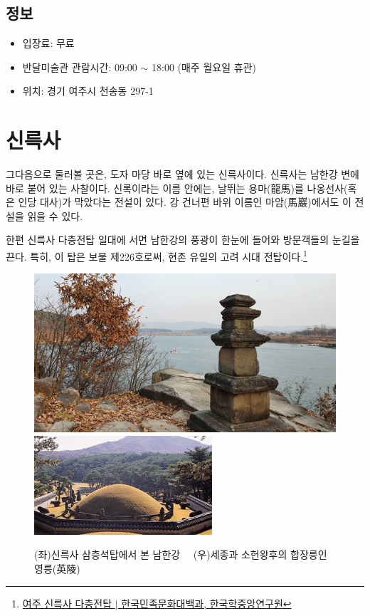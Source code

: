 \subsection{정보}

\begin{itemize}
\item 입장료: 무료
\item 반달미술관 관람시간: 09:00 $\sim$ 18:00 (매주 월요일 휴관)
\item 위치: 경기 여주시 천송동 297-1
\end{itemize}

\section{신륵사}
그다음으로 둘러볼 곳은, 도자 마당 바로 옆에 있는 신륵사이다. 신륵사는 남한강 변에 바로 붙어 있는 사찰이다. 
신록이라는 이름 안에는, 날뛰는 용마(龍馬)를 나옹선사(혹은 인당 대사)가 막았다는 전설이 있다.
강 건너편 바위 이름인 마암(馬巖)에서도 이 전설을 읽을 수 있다.


한편 신륵사 다층전탑 일대에 서면 남한강의 풍광이 한눈에 들어와 방문객들의 눈길을 끈다. 
특히, 이 탑은 보물 제226호로써, 현존 유일의 고려 시대 전탑이다.\footnote{
\href{https://terms.naver.com/entry.naver?docId=560144&cid=46656&categoryId=46656}{여주 신륵사 다층전탑 $|$ 한국민족문화대백과, 한국학중앙연구원}} 
 
 \begin{figure}[ht]
    \centering
    \includegraphics[width=.4\textwidth]{img/신륵사 삼층석탑.jpg}
    \includegraphics[width=.4\textwidth]{img/영릉.jpg}
    \caption{(좌)신륵사 삼층석탑에서 본 남한강\protect\footnotemark  $\quad$ (우)세종과 소헌왕후의 합장릉인 영릉(英陵)\protect\footnotemark}
    \label{fig:my_labe5}
\end{figure}


